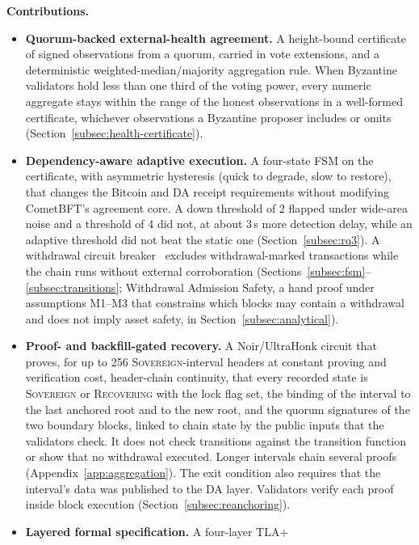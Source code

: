 \textbf{Contributions.}
\begin{itemize}
    \item \textbf{Quorum-backed external-health agreement.} A height-bound
    certificate of signed observations from a quorum,
    carried in vote extensions, and a deterministic weighted-median/majority
    aggregation rule. When Byzantine validators hold less than one third of the voting power, every numeric aggregate stays within
    the range of the honest observations in a well-formed certificate,
    whichever observations a Byzantine proposer includes or omits
    (Section~\ref{subsec:health-certificate}).
    \item \textbf{Dependency-aware adaptive execution.} A four-state FSM on the
    certificate, with asymmetric hysteresis (quick to degrade, slow to restore), that
    changes the Bitcoin and DA receipt requirements without modifying CometBFT's
    agreement core. A down threshold of 2 flapped under wide-area noise and a
    threshold of 4 did not, at about 3\,s more detection delay, while an adaptive
    threshold did not beat the static one (Section~\ref{subsec:rq3}). A withdrawal circuit
    breaker~\cite{mendonca2020resiliency} excludes withdrawal-marked transactions while
    the chain runs without external corroboration
    (Sections~\ref{subsec:fsm}--\ref{subsec:transitions}; Withdrawal Admission
    Safety, a hand proof under assumptions M1--M3 that constrains which blocks may contain a withdrawal and does not imply asset safety, in Section~\ref{subsec:analytical}).
    \item \textbf{Proof- and backfill-gated recovery.} A Noir/UltraHonk circuit
    that proves, for up to 256 \textsc{Sovereign}-interval headers at constant
    proving and verification cost, header-chain continuity, that every recorded
    state is \textsc{Sovereign} or \textsc{Recovering} with the lock flag set,
    the binding of the interval to the last anchored root and to the new root,
    and the quorum signatures of the two boundary blocks, linked to chain state by
    the public inputs that the validators check. It does not check
    transitions against the transition function or show that no withdrawal
    executed. Longer intervals chain several proofs
    (Appendix~\ref{app:aggregation}). The exit condition also requires that the
    interval's data was published to the DA layer. Validators verify each proof
    inside block execution (Section~\ref{subsec:reanchoring}).
    \item \textbf{Layered formal specification.} A four-layer TLA+

\end{itemize}

